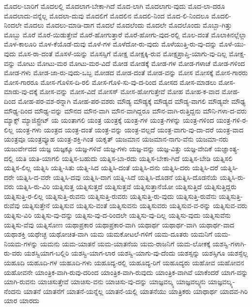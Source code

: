 {ಮೊದಲ-ಬಾರಿಗೆ
ಮೊದಲಲ್ಲಿ
ಮೊದಲಾಗ-ಬೇಕಾ-ಗಿದೆ
ಮೊದ-ಲಾಗಿ
ಮೊದಲಾಗು-ವುದು
ಮೊದ-ಲಾ-ದರೂ
ಮೊದಲಾದು-ವನ್ನೆಲ್ಲ
ಮೊದಲಾ-ದುವು
ಮೊದಲಿಗೆ
ಮೊದಲಿನ
ಮೊದಲಿ-ನಿಂದ
ಮೊದ-ಲಿ-ನಿಂದಲೂ
ಮೊದಲಿ-ನಿಂದಲೇ
ಮೊದಲು
ಮೊದಲು-ಮಾಡಿ-ದಾಗ
ಮೊದಲೆ
ಮೊದಲೆಂದು
ಮೊದಲೇ
ಮೊದಲೊಂದು
ಮೊಬ್ಬಾ-ಗಿತ್ತು
ಮೊಬ್ಬು
ಮೊರೆ
ಮೊರೆ-ಯಿಡುತ್ತೇವೆ
ಮೊರೆ-ಹೋಗುತ್ತಾರೆ
ಮೊರೆ-ಹೋಗು-ವುದ-ರಲ್ಲಿ
ಮೊಲ-ದಂತೆ
ಮೊಲಾಕಿನಲ್ಲೆಲ್ಲಾ
ಮೊಳ-ಕಾಲೂರಿ
ಮೊಳ-ಕೆಯೊಡೆ-ದುವು
ಮೊಳೆ-ಗಳ
ಮೊಳೆದೋ-ರು-ವುದು
ಮೊಳೆಯುತ್ತಿ-ರು-ವು-ದನ್ನು
ಮೊಳೆ-ಯು-ವುದು
ಮೊಸ-ರಾ-ದಂತೆ
ಮೊಸಳೆ-ಯನ್ನು
ಮೊಸಸ್ಸಿಗೆ
ಮೋಕ್ಷ
ಮೋಕ್ಷಕ್ಕಿ-ರುವ
ಮೋಕ್ಷಪ್ರಾಪ್ತಿ-ಯಾಗು-ವು-ದಿಲ್ಲ
ಮೋಕ್ಷ-ವನ್ನು
ಮೋಟು
ಮೋಟು-ಮರ
ಮೋಟು-ಮರ-ವಿದೆ
ಮೋಡ
ಮೋಡಕ್ಕೆ
ಮೋಡ-ಗಳ
ಮೋಡ-ಗಳಾಚೆ
ಮೋಡ-ಗಳಿಂದ
ಮೋಡ-ಗಳು
ಮೋಡ-ಜಾ-ರು-ವುದು-ಒಬ್ಬ
ಮೋಡದ
ಮೋಡ-ದಂತೆ
ಮೋಡ-ವನ್ನು
ಮೋಸ
ಮೋಸಕ್ಕೆ
ಮೋಸ-ಗಾರರು
ಮೋಸ-ಗಾರರೂ
ಮೋಸ-ಗೊಳಿಸ-ದಿ-ರಲಿ
ಮೋಸ-ಗೊಳಿ-ಸು-ವು-ದ-ರಿಂದ
ಮೋಸದ
ಮೋಸ-ಮಾಡಲು
ಮೋಸ-ಮಾಡು-ವು-ದಕ್ಕೆ
ಮೋಸ-ವನ್ನು
ಮೋಸ-ವಿದೆ
ಮೋಸಸ್
ಮೋಸ-ಹೋಗುತ್ತೇವೆ
ಮೋಹ
ಮೋಹ-ಕ-ವಾದ
ಮೋಹ-ದಿಂದ
ಮೋಹ-ಪರ-ವಶ-ರನ್ನಾಗಿ
ಮೋಹ-ಪರ-ವಶರು
ಮೌಡ್ಯ
ಮೌಡ್ಯಕ್ಕೆ
ಮೌಡ್ಯದ
ಮೌಡ್ಯ-ವಾಗಲಿ
ಮೌಡ್ಯವೇ
ಮೌಢ್ಯ
ಮೌಢ್ಯ-ದಿಂದ
ಮೌಢ್ಯ-ವನ್ನು
ಮೌನದ
ಮೌನ-ವಾಗಿ
ಮೌನ-ವಾಗಿದ್ದರೂ
ಮೌನ-ವಾಗಿ-ರುತ್ತಿದ್ದನು
ಮೌನಿ-ಗಳಾ-ದ-ವರು
ಮ್ಯಾಕ್ಸ್
ಮ್ಯಾಜಿಸ್ಟ್ರೇಟ್
ಯ
ಯಂತಾಗಲಿ
ಯಂತ್ರ
ಯಂತ್ರಕ್ಕೆ
ಯಂತ್ರ-ಗಳ
ಯಂತ್ರ-ಗಳನ್ನು
ಯಂತ್ರ-ಗಳಿಂದ
ಯಂತ್ರ-ಗಳಿ-ರ-ಲಿಲ್ಲ
ಯಂತ್ರ-ಗಳು
ಯಂತ್ರದ
ಯಂತ್ರ-ದಂತೆ
ಯಂತ್ರ-ವನ್ನು
ಯಂತ್ರ-ವಲ್ಲದೆ
ಯಂತ್ರ-ವಾಗು-ವು-ದಾ-ದರೆ
ಯಂತ್ರ-ವಾದ
ಯಂತ್ರವೂ
ಯಂತ್ರವ್ಯೂಹ
ಯಂತ್ರ-ಶಕ್ತಿ-ಗಿಂತ
ಯಕೃತ್
ಯಜಮಾನ
ಯಜಮಾನ-ನಾಗು-ವೆನು
ಯಜಮಾ-ನರು
ಯಜುರ್ವೇದದ
ಯಜ್ಞ
ಯಜ್ಞಕ್ಕೂ
ಯಜ್ಞ-ಗಳಿವೆ
ಯಜ್ಞ-ಗಳು
ಯಜ್ಞ-ವನ್ನು
ಯಜ್ಞ-ವಿತ್ತು
ಯಜ್ಞ-ವೇದಿಕೆ
ಯಜ್ಞಾಂತ್ಯ-ದಲ್ಲಿ
ಯತಿ
ಯತಿ-ಯಾಗಲಿ
ಯತ್ನಿಸ-ಬಹುದು
ಯತ್ನಿಸ-ಬಾ-ರದು
ಯತ್ನಿಸ-ಬೇಕಾ-ಗಿದೆ
ಯತ್ನಿಸ-ಬೇಡಿ
ಯತ್ನಿಸಲಿ
ಯತ್ನಿಸ-ಲಿಲ್ಲ
ಯತ್ನಿಸಿ
ಯತ್ನಿ-ಸಿತು
ಯತ್ನಿ-ಸಿದ
ಯತ್ನಿಸಿ-ದಂತೆ
ಯತ್ನಿಸಿ-ದನು
ಯತ್ನಿಸಿ-ದರು
ಯತ್ನಿಸಿ-ದರೆ
ಯತ್ನಿಸಿ-ದರೇ
ಯತ್ನಿಸಿ-ದ-ವರೇ
ಯತ್ನಿಸಿ-ದವು
ಯತ್ನಿಸಿ-ದಾಗ
ಯತ್ನಿ-ಸಿದೆ
ಯತ್ನಿಸಿ-ದೊಡನೆ
ಯತ್ನಿಸಿ-ದೊಡನೆಯೆ
ಯತ್ನಿಸಿ-ರು-ವರು
ಯತ್ನಿಸಿ-ರು-ವಿರಿ
ಯತ್ನಿಸುತ್ತ
ಯತ್ನಿಸುತ್ತದೆ
ಯತ್ನಿಸುತ್ತವೆ
ಯತ್ನಿಸುತ್ತಾನೆಯೋ
ಯತ್ನಿಸುತ್ತಿದೆ
ಯತ್ನಿಸುತ್ತಿದ್ದರು
ಯತ್ನಿಸುತ್ತಿ-ರ-ಲಿಲ್ಲ
ಯತ್ನಿಸುತ್ತಿ-ರುವನು
ಯತ್ನಿಸುತ್ತಿ-ರುವರು
ಯತ್ನಿಸುತ್ತಿ-ರು-ವುದು
ಯತ್ನಿಸುತ್ತಿ-ರುವೆನು
ಯತ್ನಿಸುತ್ತಿ-ರುವೆವು
ಯತ್ನಿಸುತ್ತೇನೆ
ಯತ್ನಿಸುವ
ಯತ್ನಿಸು-ವಂತೆ
ಯತ್ನಿಸುವನು
ಯತ್ನಿಸುವರು
ಯತ್ನಿಸುವ-ವ-ರನ್ನು
ಯತ್ನಿಸುವ-ವರು
ಯತ್ನಿಸು-ವಿರಿ
ಯತ್ನಿಸು-ವು-ದನ್ನು
ಯತ್ನಿಸು-ವು-ದ-ರಿಂದಲೇ
ಯತ್ನಿಸು-ವು-ದಿಲ್ಲ
ಯತ್ನಿಸು-ವುದು
ಯತ್ನಿಸುವೆನು
ಯತ್ನಿಸು-ವೆವು
ಯತ್ನಿಸೋಣ
ಯಥಾಪ್ರಕಾರ
ಯಥಾಪ್ರಕಾರ-ವಾಗಿ
ಯಥಾರ್ಥ
ಯಥಾರ್ಥ-ವಾಗಿ
ಯಥಾರ್ಥ-ವಾದ
ಯಥಾಶಕ್ತಿ
ಯಥೇಚ್ಛ
ಯಥೋಚಿತ-ವಾಗಿ
ಯಮ
ಯಮಕೋಟಲೆ-ಗಳಿಗೆ
ಯಮ-ದೂತರು
ಯಮನಿಗೆ
ಯಮ-ನಿಯಮ-ಗಳನ್ನು
ಯಮನು
ಯಮ-ಯಾತನೆ
ಯಮ-ಯಾತನೆಯ
ಯಮ-ರಾಜನಿಗೆ
ಯಮ-ಲೋಕಕ್ಕೆ
ಯಶಸ್ವಿ-ಗಳಾಗಿ-ರು-ವರು
ಯಶಸ್ವಿಯಾಗ-ಬಲ್ಲಿರಿ
ಯಶಸ್ವಿ-ಯಾಗ-ಲಾರ
ಯಶಸ್ವಿ-ಯಾಗು-ವು-ದೆಂದು
ಯಶಸ್ಸನ್ನು
ಯಶಸ್ಸಿಗೂ
ಯಶಸ್ಸೆಲ್ಲ
ಯಹೂದಿ
ಯಹೂದಿ-ಗಳ
ಯಹೂದಿ-ಗಳು
ಯಹೂದ್ಯ-ರಲ್ಲಿ
ಯಹೂದ್ಯ-ರಿಗೆ
ಯಹೂದ್ಯರು
ಯಹೋವ
ಯಹೋವನ
ಯಹೋವನೇ
ಯಾಂತ್ರಿಕ-ವಾಗಿ-ರುವು-ದರಿಂದ
ಯಾಂತ್ರಿಕ-ವಾಗಿ-ರುವುದು
ಯಾಂತ್ರಿಕ-ವಾಗಿವೆ
ಯಾಕೆಂದರೆ
ಯಾಗ-ವನ್ನು
ಯಾಗಿ-ರುವನು
ಯಾಚಿಸುತ್ತೇವೆ
ಯಾಚಿಸು-ವನು
ಯಾಚಿಸು-ವು-ದನ್ನು
ಯಾಜ್ಞವಲ್ಕ್ಯ
ಯಾಜ್ಞವಲ್ಕ್ಯನು
ಯಾಜ್ಞವಲ್ಕ್ಯ-ನೆಂದನು
ಯಾತನೆ
ಯಾತನೆಗೆ
ಯಾತನೆ-ಯನ್ನೆಲ್ಲ
ಯಾತನೆ-ಯಲ್ಲಿ
ಯಾತನೆಯು
ಯಾತ್ರಿಕರು
ಯಾಥಾರ್ಥ
ಯಾದವ-ಗಿರಿ
ಯಾರ
ಯಾರದು
}
